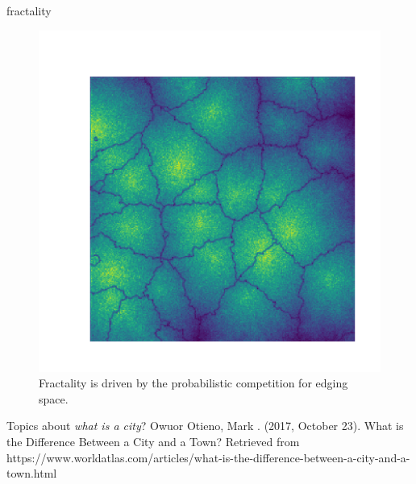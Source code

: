 \documentclass{beamer}
\begin{document}
\begin{frame}{fractality}
  \begin{figure}
    \includegraphics[width = 0.7\linewidth]{pics/fractal_41_256.pdf}
    \caption{Fractality is driven by the probabilistic competition for edging space.}
  \end{figure}
\end{frame}

\begin{frame}{Topics about \emph{what is a city}?}
  Owuor Otieno, Mark . (2017, October 23). What is the Difference Between a City and a Town? Retrieved from https://www.worldatlas.com/articles/what-is-the-difference-between-a-city-and-a-town.html
\end{frame}
\end{document}
